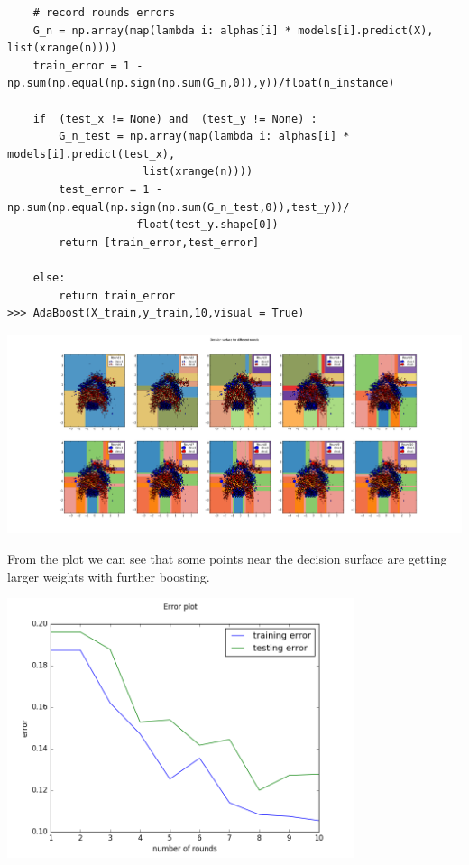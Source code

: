\documentclass{article}
\newenvironment{sub}[2][$-$]{\begin{trivlist}
		\item[\hskip \labelsep {\bfseries #1}\hskip \labelsep {\bfseries #2.}]}  {\end{trivlist}}
\begin{document}
\begin{verbatim}
    # record rounds errors
    G_n = np.array(map(lambda i: alphas[i] * models[i].predict(X), list(xrange(n))))
    train_error = 1 - np.sum(np.equal(np.sign(np.sum(G_n,0)),y))/float(n_instance)

    if  (test_x != None) and  (test_y != None) :
        G_n_test = np.array(map(lambda i: alphas[i] * models[i].predict(test_x),
        			 list(xrange(n))))
        test_error = 1 - np.sum(np.equal(np.sign(np.sum(G_n_test,0)),test_y))/
        			float(test_y.shape[0])
        return [train_error,test_error]

    else:
        return train_error
>>> AdaBoost(X_train,y_train,10,visual = True)
\end{verbatim}


\includegraphics[width = 7in]{3_1_2}

From the plot we can see that some points near the decision surface are getting larger weights with further boosting. 

\begin{sub}{3.1.3}
\end{sub}

\begin{center}
\includegraphics[width = 4in]{3_1_3}
\end{center}
\end{document}
